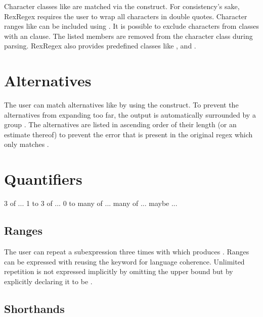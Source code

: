 Character classes like \pattern{[abc]} are matched via the  construct. For consistency's sake, RexRegex requires the user to wrap all characters in double quotes. Character ranges like \pattern{[a-z]} can be included using . It is possible to exclude characters from classes with an  clause. The listed members are removed from the character class during parsing. RexRegex also provides predefined classes like ,  and . 

\section{Alternatives}

The user can match alternatives like  by using the  construct. To prevent the alternatives from expanding too far, the output is automatically surrounded by a group . The alternatives are listed in ascending order of their length (or an estimate thereof) to prevent the error that is present in the original regex which only matches .

\section{Quantifiers}

\begin{rexregexBox}[title={Quantifiers in RexRegex},label=code:quantifiersInRexRegex,width=8.5cm,center]
3 of ...
1 to 3 of ...
0 to many of ...
many of ...
maybe ...
\end{rexregexBox}

\subsection{Ranges} \label{sec:dslQuantifierRanges}

The user can repeat a subexpression three times with  which produces . Ranges can be expressed with  reusing the  keyword for language coherence. Unlimited repetition is not expressed implicitly by omitting the upper bound  but by explicitly declaring it to be .

\subsection{Shorthands}


